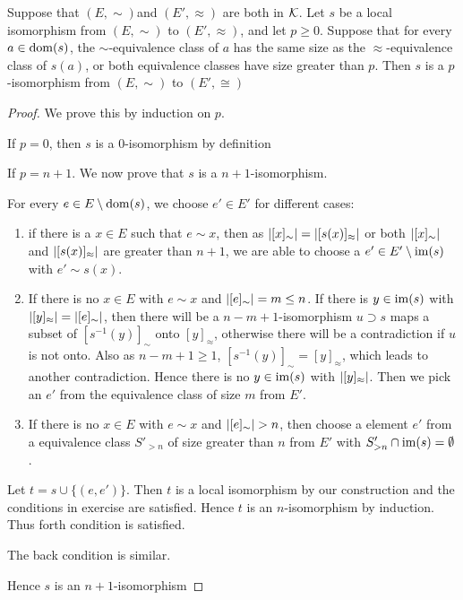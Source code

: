 \documentclass[11pt]{article}
\begin{document}
\begin{exercise}
\label{ex5}
Suppose that \((E,\sim)\)and \((E',\approx)\) are both in \(\mathcal{K}\). Let \(s\) be a local isomorphism
from \((E,\sim)\) to \((E',\approx)\), and let \(p\ge 0\). Suppose that for every \(a\in\operatorname{dom}(s)\),
the \(\sim\)-equivalence class of \(a\) has the same size as the \(\approx\)-equivalence class of \(s(a)\),
or both equivalence classes have size greater than \(p\). Then \(s\) is a \(p\)-isomorphism
from \((E,\sim)\) to \((E',\cong)\)
\end{exercise}

\begin{proof}


We prove this by induction on \(p\).

If \(p=0\), then \(s\) is a 0-isomorphism by definition

If \(p=n+1\). We now prove that \(s\) is a \(n+1\)-isomorphism.

For every \(e\in E\setminus\operatorname{dom}(s)\), we choose \(e'\in E'\) for different cases:
\begin{enumerate}
\item if there is a \(x\in E\) such that \(e\sim x\), then as \(\abs{[x]_\sim}=\abs{[s(x)]_\approx}\) or
both \(\abs{[x]_\sim}\) and \(\abs{[s(x)]_\approx}\) are greater than \(n+1\), we are able to choose
a \(e'\in E'\setminus\operatorname{im}(s)\) with \(e'\sim s(x)\).

\item If there is no \(x\in E\) with \(e\sim x\) and \(\abs{[e]_\sim}=m\le n\). If there is \(y\in\operatorname{im}(s)\)
with \(\abs{[y]_\approx}=\abs{[e]_\sim}\), then there will be a \(n-m+1\)-isomorphism \(u\supset s\)
maps a subset of \([s^{-1}(y)]_\sim\) onto \([y]_\approx\), otherwise there will be a contradiction
if \(u\) is not onto. Also
as \(n-m+1\ge 1\), \([s^{-1}(y)]_\sim=[y]_\approx\),
which leads to another contradiction. Hence there is no \(y\in\operatorname{im}(s)\) with \(\abs{[y]_\approx}\). Then we pick
an \(e'\) from the equivalence class of size \(m\) from \(E'\).

\item If there is no \(x\in E\) with \(e\sim x\) and \(\abs{[e]_\sim}>n\), then choose a element \(e'\) from a
equivalence class \(S'_{>n}\) of size greater than \(n\)
from \(E'\) with \(S_{>n}'\cap\operatorname{im}(s)=\emptyset\).
\end{enumerate}

Let \(t=s\cup\{(e,e')\}\). Then \(t\) is a local isomorphism by our construction and the conditions in
exercise are satisfied. Hence \(t\) is an \(n\)-isomorphism by induction. Thus forth condition is satisfied.

The back condition is similar.

Hence \(s\) is an \(n+1\)-isomorphism
\end{proof}
\end{document}
